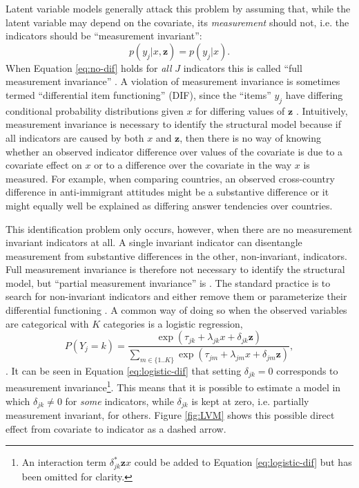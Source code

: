 \documentclass[letterpaper,12pt]{article}
\begin{document}
Latent variable models generally attack this problem by assuming that, while the latent variable may depend on the covariate, its \emph{measurement} should not, i.e. the indicators should be ``measurement invariant'':
\begin{equation}
	p(y_j | x, \mathbf{z}) = p(y_j | x).
	\label{eq:no-dif}
\end{equation}
When Equation \ref{eq:no-dif} holds for \emph{all} $J$ indicators this is called ``full measurement invariance'' \citep{meredith1993measurement}. 
A violation of  measurement invariance is sometimes termed ``differential item functioning'' (DIF), since the ``items'' $y_j$ have differing conditional probability distributions given $x$ for differing values of $\mathbf{z}$ \citep{mellenbergh1989item}.
Intuitively, measurement invariance is necessary to identify the structural model  because if all indicators are caused by both $x$ and $\mathbf{z}$, then there is no way of knowing whether an observed indicator difference  over values of the covariate is due to a covariate effect on  $x$ or to a difference over the covariate in the way $x$ is measured. For example, when comparing countries, an observed cross-country difference in anti-immigrant attitudes might be a substantive difference or it might equally well be explained as differing answer tendencies over countries. 

This identification problem only occurs, however, when there are no measurement invariant indicators at all. A single invariant indicator can disentangle measurement from substantive differences in the other, non-invariant, indicators. Full measurement invariance is therefore not necessary to identify the structural model, but ``partial measurement invariance'' is \citep{byrne1989testing}. The standard practice is to search for non-invariant indicators and either remove them or parameterize their differential functioning \citep{Holland:1993aa}. 
A common way of doing so when the observed variables are categorical with $K$ categories is a logistic regression, 
\begin{equation}
	P(Y_j = k) = \frac{\exp(\tau_{jk} + \lambda_{jk} x + \delta_{jk} \mathbf{z})}{\sum_{m \in \{1..K\}} \exp(\tau_{jm} + \lambda_{jm} x + \delta_{jm} \mathbf{z})},
	\label{eq:logistic-dif}
\end{equation}
\citep{mellenbergh1989item,kankaras2010testing}.
It can be seen in Equation \ref{eq:logistic-dif} that setting $\delta_{jk} = 0$ corresponds to measurement invariance\footnote{An interaction term $\delta_{jk}^* \mathbf{z}x$ could be added to Equation \ref{eq:logistic-dif} but has been omitted for clarity.}. This means that it is possible to estimate a model in which $\delta_{jk} \neq 0$ for \emph{some} indicators, while $\delta_{jk}$ is kept at zero, i.e. partially measurement invariant, for others. 
Figure \ref{fig:LVM} shows this possible direct effect from covariate to indicator as a dashed arrow. 
\end{document}
